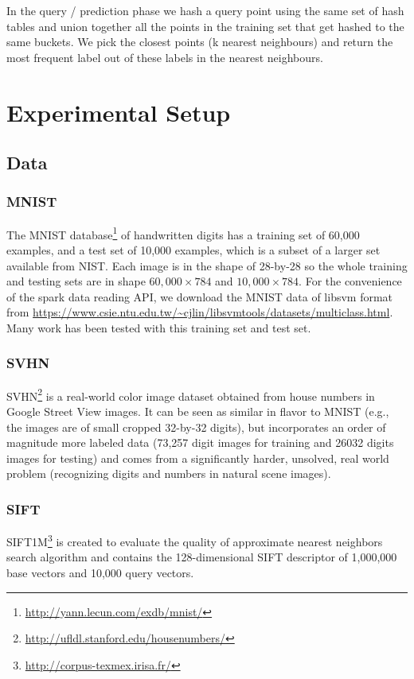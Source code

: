 \documentclass[letterpaper,twocolumn,10pt]{article}
\theoremstyle{definition}
\begin{document}
In the query / prediction phase we hash a query point using the same set of hash tables and union 
together all the points in the training set that get hashed to the same buckets. We pick the closest 
points (k nearest neighbours) and return the most frequent label out of these labels in the nearest 
neighbours.

\section{Experimental Setup}

\subsection{Data}
\subsubsection{MNIST}
The MNIST database\footnote{\url{http://yann.lecun.com/exdb/mnist/}}\cite{lecun1998gradient} of handwritten digits has a training set of 60,000 examples, and a test set of 10,000 examples, which is a subset of a larger set available from NIST. Each image is in the shape of 28-by-28 so the whole training and testing sets are in shape $60,000 \times 784$ and $10,000 \times 784$. For the convenience of the spark data reading API, we download the MNIST data of libsvm format from \url{https://www.csie.ntu.edu.tw/~cjlin/libsvmtools/datasets/multiclass.html}.
Many work has been tested with this training set and test set\cite{lecun1998gradient,ciresan2011flexible,jarrett2009best}.

\subsubsection{SVHN}
SVHN\footnote{\url{http://ufldl.stanford.edu/housenumbers/}}\cite{netzer2011reading} is a real-world color image dataset obtained from house numbers in Google
Street View images. It can be seen as similar in flavor to MNIST (e.g., the images are of small cropped 32-by-32 digits), but incorporates an order of magnitude more labeled data (73,257 digit images for training and 26032 digits images for testing) and comes from a significantly harder, unsolved, real world problem (recognizing digits and numbers in natural scene images). 

\subsubsection{SIFT}
SIFT1M\footnote{\url{http://corpus-texmex.irisa.fr/}}\cite{jegou2011product} is created to evaluate the quality of approximate nearest neighbors search algorithm and contains the 128-dimensional SIFT descriptor of 1,000,000 base vectors and 10,000 query vectors. 
\end{document}
